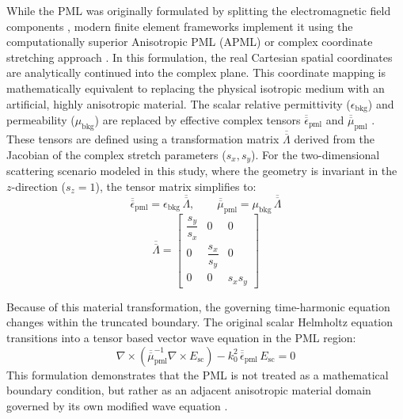 While the PML was originally formulated by splitting the electromagnetic field components \citep{Berenger1994}, modern finite element frameworks implement it using the computationally superior Anisotropic PML (APML) or complex coordinate stretching approach \citep{Jiao2003}. In this formulation, the real Cartesian spatial coordinates are analytically continued into the complex plane. This coordinate mapping is mathematically equivalent to replacing the physical isotropic medium with an artificial, highly anisotropic material. The scalar relative permittivity ($\epsilon_{\text{bkg}}$) and permeability ($\mu_{\text{bkg}}$) are replaced by effective complex tensors $\overline{\overline{\epsilon}}_{\text{pml}}$ and $\overline{\overline{\mu}}_{\text{pml}}$ \citep{Jiang2021}. These tensors are defined using a transformation matrix $\overline{\overline{\Lambda}}$ derived from the Jacobian of the complex stretch parameters ($s_x, s_y$). For the two-dimensional scattering scenario modeled in this study, where the geometry is invariant in the $z$-direction ($s_z = 1$), the tensor matrix simplifies to:
\begin{equation}
\overline{\overline{\epsilon}}_{\text{pml}} = \epsilon_{\text{bkg}} \, \overline{\overline{\Lambda}}, \qquad \overline{\overline{\mu}}_{\text{pml}} = \mu_{\text{bkg}} \, \overline{\overline{\Lambda}}
\end{equation}
\begin{equation}
\overline{\overline{\Lambda}} =
\begin{bmatrix}
\dfrac{s_y}{s_x} & 0 & 0 \\[10pt]
0 & \dfrac{s_x}{s_y} & 0 \\[10pt]
0 & 0 & s_x s_y
\end{bmatrix}
\end{equation}

Because of this material transformation, the governing time-harmonic equation changes within the truncated boundary. The original scalar Helmholtz equation transitions into a tensor based vector wave equation in the PML region:
\begin{equation}
\nabla \times \left( \overline{\overline{\mu}}_{\text{pml}}^{-1} \nabla \times E_{\text{sc}} \right) - k_0^2 \, \overline{\overline{\epsilon}}_{\text{pml}} \, E_{\text{sc}} = 0
\label{eq:pml_wave}
\end{equation}
This formulation demonstrates that the PML is not treated as a mathematical boundary condition, but rather as an adjacent anisotropic material domain governed by its own modified wave equation \citep{Jiao2003}.

